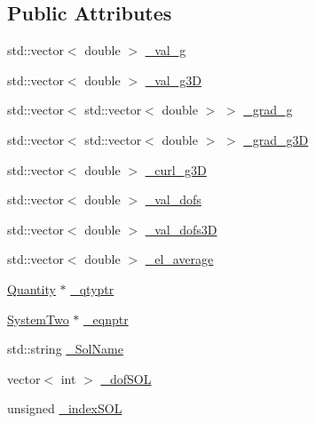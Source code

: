 \subsection*{Public Attributes}
\begin{DoxyCompactItemize}
\item 
std\+::vector$<$ double $>$ \mbox{\hyperlink{classfemus_1_1_current_quantity_a8ff27a2ef6790e801f9e824620cc9ec9}{\+\_\+val\+\_\+g}}
\item 
std\+::vector$<$ double $>$ \mbox{\hyperlink{classfemus_1_1_current_quantity_a2764618c51435196ac354bccc3539908}{\+\_\+val\+\_\+g3D}}
\item 
std\+::vector$<$ std\+::vector$<$ double $>$ $>$ \mbox{\hyperlink{classfemus_1_1_current_quantity_a1b6f06e4a4cb17b704609153a0b52a62}{\+\_\+grad\+\_\+g}}
\item 
std\+::vector$<$ std\+::vector$<$ double $>$ $>$ \mbox{\hyperlink{classfemus_1_1_current_quantity_a7f82eb35d327926945abec67effe97d7}{\+\_\+grad\+\_\+g3D}}
\item 
std\+::vector$<$ double $>$ \mbox{\hyperlink{classfemus_1_1_current_quantity_ab7078b47577ebf640494592680e731e4}{\+\_\+curl\+\_\+g3D}}
\item 
std\+::vector$<$ double $>$ \mbox{\hyperlink{classfemus_1_1_current_quantity_a6ca5e1bf05a00f9219c1bcbc4ce8d110}{\+\_\+val\+\_\+dofs}}
\item 
std\+::vector$<$ double $>$ \mbox{\hyperlink{classfemus_1_1_current_quantity_af6e9c491715aae893107fb912204373c}{\+\_\+val\+\_\+dofs3D}}
\item 
std\+::vector$<$ double $>$ \mbox{\hyperlink{classfemus_1_1_current_quantity_a36ad7fc877c7b35df26aada590e0c86d}{\+\_\+el\+\_\+average}}
\item 
\mbox{\hyperlink{classfemus_1_1_quantity}{Quantity}} $\ast$ \mbox{\hyperlink{classfemus_1_1_current_quantity_a5f5af72cccd35b99437d26387b9feca3}{\+\_\+qtyptr}}
\item 
\mbox{\hyperlink{classfemus_1_1_system_two}{System\+Two}} $\ast$ \mbox{\hyperlink{classfemus_1_1_current_quantity_a0283bfb1b357e50c030ae1aef8657c44}{\+\_\+eqnptr}}
\item 
std\+::string \mbox{\hyperlink{classfemus_1_1_current_quantity_ae3f04b758433260bab0f0df15214677a}{\+\_\+\+Sol\+Name}}
\item 
vector$<$ int $>$ \mbox{\hyperlink{classfemus_1_1_current_quantity_aeaba1fd7e7164f9c788399d62e90c8e0}{\+\_\+dof\+S\+OL}}
\item 
unsigned \mbox{\hyperlink{classfemus_1_1_current_quantity_a2ad0c3b02ab0057df318b2633ceb6572}{\+\_\+index\+S\+OL}}

\end{DoxyCompactItemize}
